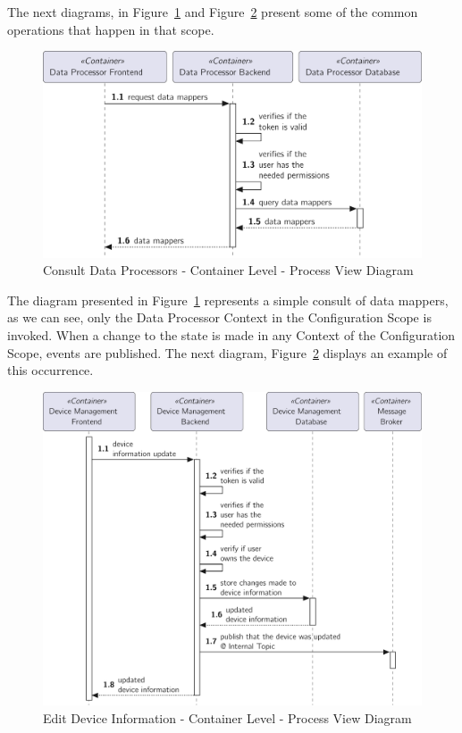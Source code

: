 The next diagrams, in Figure~\ref{fig:design:architecture:platform:container:process:diagram:processor} and Figure~\ref{fig:design:architecture:platform:container:process:diagram:device} present some of the common operations that happen in that scope.

\begin{figure}
   \centering
   \includegraphics[page=1,width=0.8\columnwidth]{assets/diagrams/design/architectural/level2/process/consult-data-processor.pdf}
   \caption[Consult Data Processors - Container Level - Process View Diagram]{Consult Data Processors - Container Level - Process View Diagram}
   \label{fig:design:architecture:platform:container:process:diagram:processor}
\end{figure}

The diagram presented in Figure~\ref{fig:design:architecture:platform:container:process:diagram:processor} represents a simple consult of data mappers, as we can see, only the Data Processor Context in the Configuration Scope is invoked. When a change to the state is made in any Context of the Configuration Scope, events are published. The next diagram, Figure~\ref{fig:design:architecture:platform:container:process:diagram:device} displays an example of this occurrence.

\begin{figure}
   \centering
   \includegraphics[page=1,width=0.8\columnwidth]{assets/diagrams/design/architectural/level2/process/edit-device-management.pdf}
   \caption[Edit Device Information - Container Level - Process View Diagram]{Edit Device Information - Container Level - Process View Diagram}
   \label{fig:design:architecture:platform:container:process:diagram:device}
\end{figure}

